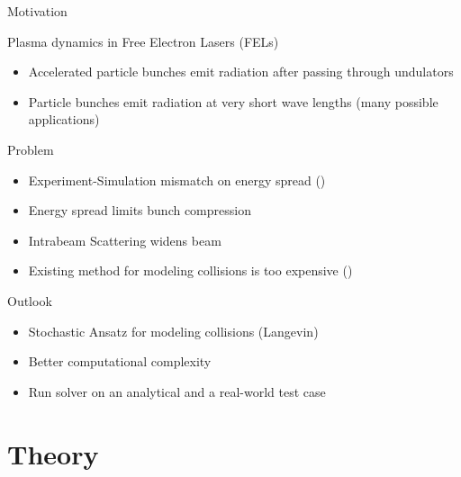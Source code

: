\begin{frame}{Motivation}
    \begin{block}{Plasma dynamics in Free Electron Lasers (FELs)}
    \begin{itemize}
        \itemVspace
        \item Accelerated particle bunches emit radiation after passing through undulators
        \item Particle bunches emit radiation at very short wave lengths (many possible
            applications) 
    \end{itemize}
    \end{block}

    \vspace{0.7mm}
    \pause

    \begin{block}{Problem}
    \begin{itemize}
        \itemVspace
        \item Experiment-Simulation mismatch on energy spread (\cite{prat2022energy})
        \item Energy spread limits bunch compression %
        \item Intrabeam Scattering widens beam
        \item Existing method for modeling collisions is too expensive (\cite{Hockney2021})
    \end{itemize}
    \end{block}

    \vspace{0.7mm}
    \pause

    \begin{block}{Outlook}
        \begin{itemize}
            \itemVspace
            \item Stochastic Ansatz for modeling collisions (Langevin)
            \item Better computational complexity
            \item Run solver on an analytical and a real-world test case
        \end{itemize}
    \end{block}

\end{frame}

\section{Theory}

